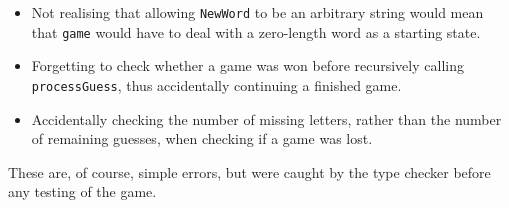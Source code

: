 \begin{itemize}
\item Not realising that allowing \texttt{NewWord} to be an arbitrary string
would mean that \texttt{game} would have to deal with a zero-length word as
a starting state.
\item Forgetting to check whether a game was won before recursively calling
\texttt{processGuess}, thus accidentally continuing a finished game.
\item Accidentally checking the number of missing letters, rather than the
number of remaining guesses, when checking if a game was lost.
\end{itemize}

\noindent
These are, of course, simple errors, but were caught by the type checker before
any testing of the game.


